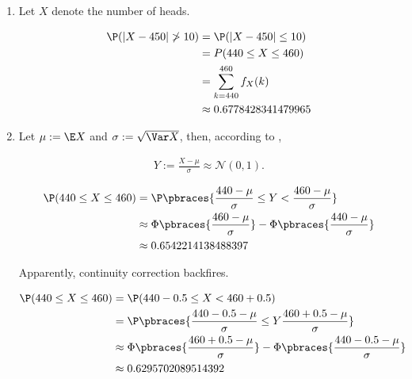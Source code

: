 \begin{solution}

\phantom{}

\begin{enumerate}[label = (\alph*)]

    \item Let $X$ denote the number of heads.
    
    \begin{align*}
        \P(|X - 450| \not > 10)
        & =
        \P(|X - 450| \leq 10) \\
        & =
        P(440 \leq X \leq 460) \\
        & =
        \sum_{k=440}^{460} f_X(k) \\
        & \approx
        0.6778428341479965
    \end{align*}

    \item Let $\mu := \E X$ and $\sigma := \sqrt{\Var X}$, then, according to \cite[Lecture 4, Slide 69]{EStat},
    
    \begin{align*}
        Y := \frac{X - \mu}{\sigma} \approx \mathcal N(0, 1).
    \end{align*}

    \begin{align*}
        \P(440 \leq X \leq 460)
        & =
        \P \pbraces{\frac{440 - \mu}{\sigma} \leq Y < \frac{460 - \mu}{\sigma}} \\
        & \approx
        \Phi \pbraces{\frac{460 - \mu}{\sigma}} - \Phi \pbraces{\frac{440 - \mu}{\sigma}} \\
        & \approx
        0.6542214138488397
    \end{align*}

    Apparently, continuity correction backfires.

    \begin{align*}
        \P(440 \leq X \leq 460)
        & =
        \P(440 - 0.5 \leq X < 460 + 0.5) \\
        & =
        \P \pbraces{\frac{440 - 0.5 - \mu}{\sigma} \leq Y \frac{460 + 0.5 - \mu}{\sigma}} \\
        & \approx
        \Phi \pbraces{\frac{460 + 0.5 - \mu}{\sigma}} - \Phi \pbraces{\frac{440 - 0.5 - \mu}{\sigma}} \\
        & \approx
        0.6295702089514392
    \end{align*}

\end{enumerate}

\end{solution}

